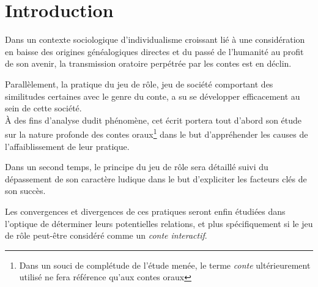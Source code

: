 \section*{Introduction}

Dans un contexte sociologique d'individualisme croissant lié à une considération en baisse des origines généalogiques directes et du passé de l'humanité au profit de son avenir, la transmission oratoire perpétrée par les contes est en déclin.

Parallèlement, la pratique du jeu de rôle, jeu de société comportant des similitudes certaines avec le genre du conte, a su se développer efficacement au sein de cette société.\\


À des fins d'analyse dudit phénomène, cet écrit portera tout d'abord son étude sur la nature profonde des contes oraux\footnote{Dans un souci de complétude de l'étude menée, le terme \textit{conte} ultérieurement utilisé ne fera référence qu'aux contes oraux} dans le but d'appréhender les causes de l'affaiblissement de leur pratique.

Dans un second temps, le principe du jeu de rôle sera détaillé suivi du dépassement de son caractère ludique dans le but d'expliciter les facteurs clés de son succès.

Les convergences et divergences de ces pratiques seront enfin étudiées dans l'optique de déterminer leurs potentielles relations, et plus spécifiquement si le jeu de rôle peut-être considéré comme un \textit{conte interactif}.

\clearpage
